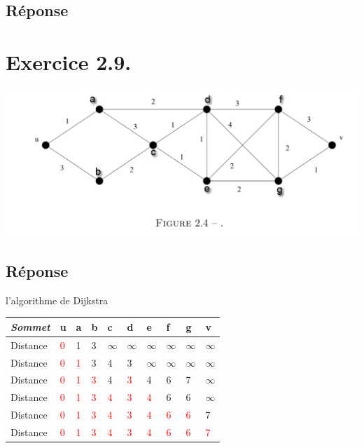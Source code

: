 \documentclass[12pt]{fphw}
\begin{document}
\subsection*{Réponse}

\section*{Exercice 2.9.}
\begin{center}
	\includegraphics[width=1\columnwidth]{Figure2.4.png} %
\end{center}
\subsection*{Réponse}
\begin{center}
l’algorithme de Dijkstra\\
	\begin{tabular}{l l l l l l l l l l}
		\toprule
		\textit{Sommet} & u & a & b & c & d &e & f & g & v\\
		\midrule
		Distance &  \textcolor{red}{0} & 1 &3 & $\infty$ & $\infty$  & $\infty$  & $\infty$  & $\infty$  & $\infty$  \\
		Distance &  \textcolor{red}{0} & \textcolor{red}{1} &3 & 4 & 3  & $\infty$  & $\infty$  & $\infty$  & $\infty$  \\
		Distance &  \textcolor{red}{0} & \textcolor{red}{1} &\textcolor{red}{3} & 4 & \textcolor{red}{3}  & 4  & 6  & 7  & $\infty$  \\
		Distance &  \textcolor{red}{0} & \textcolor{red}{1} &\textcolor{red}{3} & \textcolor{red}{4} & \textcolor{red}{3}  & \textcolor{red}{4}  & 6  & 6  & $\infty$  \\
		Distance &  \textcolor{red}{0} & \textcolor{red}{1} &\textcolor{red}{3} & \textcolor{red}{4} & \textcolor{red}{3}  & \textcolor{red}{4}  & \textcolor{red}{6}  & \textcolor{red}{6}  & 7  \\
		Distance &  \textcolor{red}{0} & \textcolor{red}{1} &\textcolor{red}{3} & \textcolor{red}{4} & \textcolor{red}{3}  & \textcolor{red}{4}  & \textcolor{red}{6}  & \textcolor{red}{6}  & \textcolor{red}{7}  \\
		\bottomrule
	\end{tabular}
\end{center}
\end{document}
